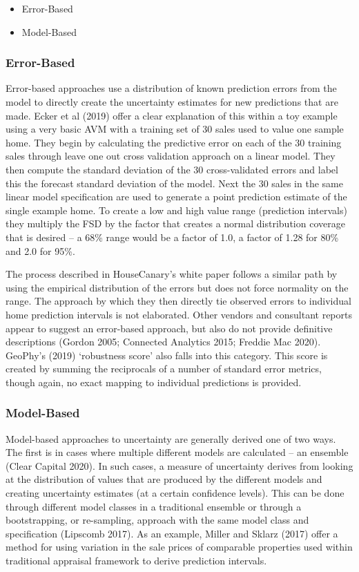 \documentclass[colTwo]{anon}
\theoremstyle{definition}
\begin{document}
\begin{itemize}
\item Error-Based
\item Model-Based
\end{itemize}

\subsubsection{Error-Based}

Error-based approaches use a distribution of known prediction errors from the model to directly create the uncertainty estimates for new predictions that are made.  Ecker et al (2019) offer a clear explanation of this within a toy example using a very basic AVM with a training set of 30 sales used to value one sample home.  They begin by calculating the predictive error on each of the 30 training sales through leave one out cross validation approach on a linear model.  They then compute the standard deviation of the 30 cross-validated errors and label this the forecast standard deviation of the model. Next the 30 sales in the same linear model specification are used to generate a point prediction estimate of the single example home.  To create a low and high value range (prediction intervals) they multiply the FSD by the factor that creates a normal distribution coverage that is desired -- a 68\% range would be a factor of 1.0, a factor of 1.28 for 80\% and 2.0 for 95\%.

The process described in HouseCanary’s white paper follows a similar path by using the empirical distribution of the errors but does not force normality on the range. The approach by which they then directly tie observed errors to individual home prediction intervals is not elaborated. Other vendors and consultant reports appear to suggest an error-based approach, but also do not provide definitive descriptions (Gordon 2005; Connected Analytics 2015; Freddie Mac 2020). GeoPhy’s (2019) ‘robustness score’ also falls into this category.  This score is created by summing the reciprocals of a number of standard error metrics, though again, no exact mapping to individual predictions is provided.

\subsubsection{Model-Based}

Model-based approaches to uncertainty are generally derived one of two ways.  The first is in cases where multiple different models are calculated -- an ensemble (Clear Capital 2020).  In such cases, a measure of uncertainty derives from looking at the distribution of values that are produced by the different models and creating uncertainty estimates (at a certain confidence levels). This can be done through different model classes in a traditional ensemble or through a bootstrapping, or re-sampling, approach with the same model class and specification (Lipscomb 2017).  As an example, Miller and Sklarz (2017) offer a method for using variation in the sale prices of comparable properties used within traditional appraisal framework to derive prediction intervals.
\end{document}
